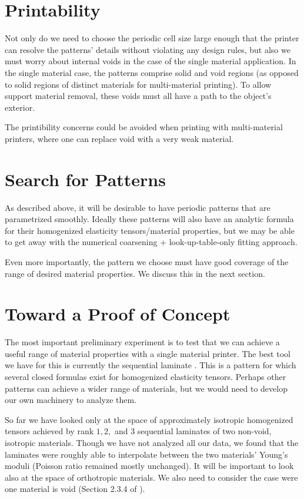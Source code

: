 \documentclass[10pt]{article}
\begin{document}
\section{Printability}
Not only do we need to choose the periodic cell size large enough that the
printer can resolve the patterns' details without violating any design rules,
but also we must worry about internal voids in the case of the single material
application. In the single material case, the patterns comprise solid and void
regions (as opposed to solid regions of distinct materials for multi-material
printing). To allow support material removal, these voids must all have a path
to the object's exterior.

The printibility concerns could be avoided when printing with multi-material
printers, where one can replace void with a very weak material.

\section{Search for Patterns}
As described above, it will be desirable to have periodic patterns that are
parametrized smoothly. Ideally these patterns will also have an analytic formula
for their homogenized elasticity tensors/material properties,
but we may be able to get away with the numerical coarsening +
look-up-table-only fitting approach.

Even more importantly, the pattern we choose must have good coverage of the
range of desired material properties. We discuss this in the next section.

\section{Toward a Proof of Concept}
The most important preliminary experiment is to test that we
can achieve a useful range of material properties with a single material
printer. The best tool we have for this is currently the sequential laminate
\cite{allaire2002shape}. This is a pattern for which several closed formulas
exist for homogenized elasticity tensors. Perhaps other patterns can achieve a
wider range of materials, but we would need to develop our own machinery to
analyze them.

So far we have looked only at the space of approximately isotropic homogenized
tensors achieved by rank $1, 2, $ and $3$ sequential laminates of two
non-void, isotropic materials. Though we have not analyzed all our data, we
found that the laminates were roughly able to interpolate between the two
materials' Young's moduli (Poisson ratio remained mostly unchanged). It will be
important to look also at the space of orthotropic materials. We also need to
consider the case were one material is void (Section 2.3.4 of
\cite{allaire2002shape}).
\end{document}
